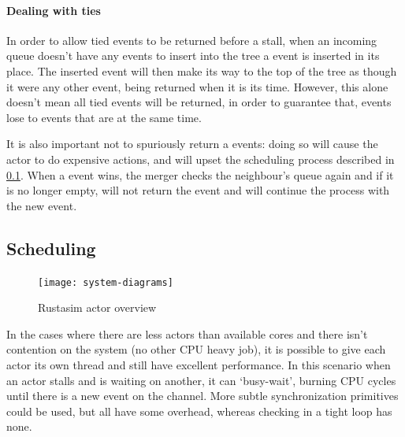 \paragraph{Dealing with ties}
In order to allow tied events to be returned before a stall, when an incoming queue doesn't have any events to insert into the tree a  event is inserted in its place.
The inserted event will then make its way to the top of the tree as though it were any other event, being returned when it is its time.
However, this alone doesn't mean all tied events will be returned, in order to guarantee that,  events lose to events that are at the same time.

It is also important not to spuriously return a  events: doing so will cause the actor to do expensive actions, and will upset the scheduling process described in \ref{rustasim-sched}.
When a  event wins, the merger checks the neighbour's queue again and if it is no longer empty, will not return the  event and will continue the process with the new event.


\subsection{Scheduling} \label{rustasim-sched}

\begin{figure}[h]
    \texttt{[image: system-diagrams]}
    \caption{Rustasim actor overview}
    \label{rustasim-scheduling:fig}
\end{figure}

In the cases where there are less actors than available cores and there isn't contention on the system (no other CPU heavy job), it is possible to give each actor its own thread and still have excellent performance.
In this scenario when an actor stalls and is waiting on another, it can `busy-wait', burning CPU cycles until there is a new event on the channel.
More subtle synchronization primitives could be used, but all have some overhead, whereas checking in a tight loop has none.

